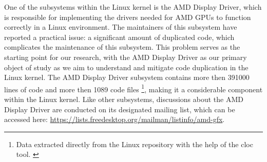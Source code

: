 One of the subsystems within the Linux kernel is the AMD Display Driver, which
is responsible for implementing the drivers needed for AMD GPUs to function
correctly in a Linux environment. The maintainers of this subsystem have
reported a practical issue: a significant amount of duplicated code, which
complicates the maintenance of this subsystem. This problem serves as the
starting point for our research, with the AMD Display Driver as our primary
object of study as we aim to understand and mitigate code duplication in the
Linux kernel. The AMD Display Driver subsystem contains more then 391000 lines 
of code and more then 1089 code files
\footnote{ 
Data extracted directly from the Linux repository with the help of the cloc tool.
\citep{cloc}
}, 
making it a considerable component within the Linux kernel. Like other 
subsystems, discussions about the AMD Display Driver are conducted on its 
designated mailing list, which can be accessed here: 
\url{https://lists.freedesktop.org/mailman/listinfo/amd-gfx}.
